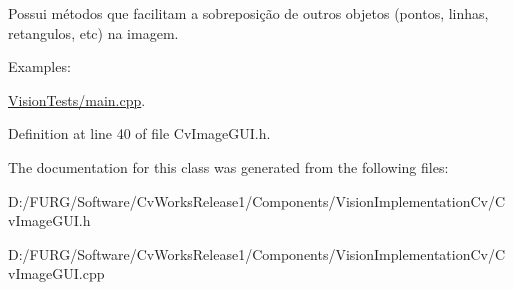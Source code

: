 Possui métodos que facilitam a sobreposição de outros objetos (pontos, linhas, retangulos, etc) na imagem. \begin{Desc}
\item[Examples\+: ]\par
\hyperlink{_vision_tests_2main_8cpp-example}{Vision\+Tests/main.\+cpp}.\end{Desc}


Definition at line 40 of file Cv\+Image\+G\+U\+I.\+h.



The documentation for this class was generated from the following files\+:\begin{DoxyCompactItemize}
\item 
D\+:/\+F\+U\+R\+G/\+Software/\+Cv\+Works\+Release1/\+Components/\+Vision\+Implementation\+Cv/Cv\+Image\+G\+U\+I.\+h\item 
D\+:/\+F\+U\+R\+G/\+Software/\+Cv\+Works\+Release1/\+Components/\+Vision\+Implementation\+Cv/Cv\+Image\+G\+U\+I.\+cpp\end{DoxyCompactItemize}
